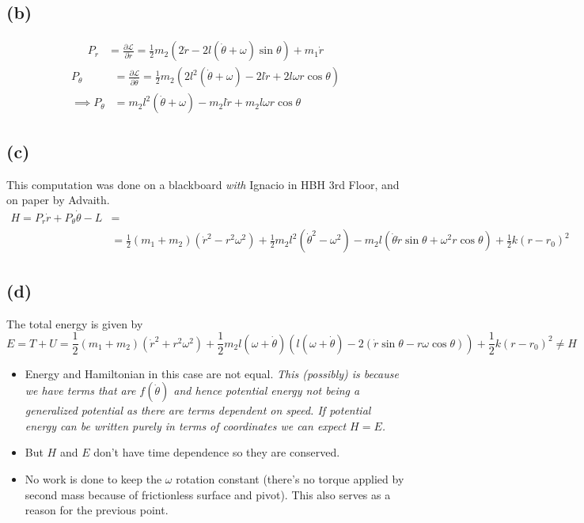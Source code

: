 \documentclass[letter, 10pts]{article}
\begin{document}
\subsection*{(b)} 
\begin{align*}
	P_r &= \frac{\partial \mathcal L}{\partial \dot r } = 
	\frac{1}{2} m_2 
\left(2 \dot r - 2l (\dot \theta  + \omega )\sin \theta\right)+ m_1 \dot r \end{align*}
\begin{align*}
	P_\theta &= \frac{\partial \mathcal L}{\partial \dot \theta} = 
	\frac{1}{2}m_2 \left(
2 l^2 (\dot \theta + \omega ) - 2 l \dot r + 2 l \omega r \cos \theta 
	\right)\\
\implies P_\theta	&= m_2 l^2 ( \dot \theta + \omega ) - m_2 l \dot r + m_2 l \omega r \cos \theta  \end{align*}






\subsection*{(c)}
This computation was done on a blackboard \emph{with} Ignacio in HBH 3rd Floor, and on paper by Advaith. 
\begin{align*}
	H = P_r \dot r + P_\theta \dot \theta - L &= \\ &  
	= \frac{1}{2} (m_1 + m_2) (\dot r ^2 - r^2 \omega ^2 )+ \frac{1}{2}m_2 l^2( \dot \theta^2 - \omega ^2) - m_2 l( \dot \theta \dot r \sin \theta + \omega^2 r \cos \theta) + \frac{1}{2} k (r- r_0)^2
\end{align*}



\subsection*{(d)} 
The total energy is given by 
\[
E = T+ U = \frac{1}{2}(m_1 + m_2) (\dot r ^2 + r^2 \omega ^2)
+ 
\frac{1}{2} m_2 l(\omega + \dot \theta) 
\left(
l (\omega + \dot \theta) - 
2 (\dot r \sin \theta - r \omega \cos \theta) 
\right)
+ 
\frac{1}{2} k (r -r_0)^2 \neq H
\] 
\begin{itemize}\item 
Energy and Hamiltonian in this case are not equal. \emph{This (possibly) is because we have terms that are $f(\dot \theta)$ and hence potential energy not being a generalized potential as there are terms dependent on speed. If potential energy can be written purely in terms of coordinates we can expect $H = E$.}

\item 
But $H$ and $E$ don't have time dependence so they are conserved. 

\item
No work is done to keep the $\omega$ rotation constant (there's no torque applied by second mass because of frictionless surface and pivot). This also serves as a reason for the previous point.  
\end{itemize}
\end{document}
